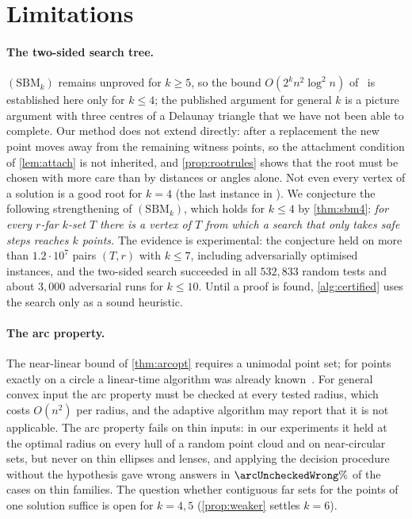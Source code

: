 \section{Limitations}\label{sec:limitations}

\paragraph{The two-sided search tree.}
$(\mathrm{SBM}_k)$ remains unproved for $k\ge5$, so the bound
$O(2^kn^2\log^2n)$ of~\citet{sbm} is established here only for $k\le4$; the
published argument for general $k$ is a picture argument with three centres of
a Delaunay triangle that we have not been able to complete. Our method does not
extend directly: after a replacement the new point moves away from the
remaining witness points, so the attachment condition of \cref{lem:attach} is
not inherited, and \cref{prop:rootrules} shows that the root must be chosen
with more care than by distances or angles alone. Not even every vertex of a
solution is a good root for $k=4$ (the last instance in
). We conjecture the following
strengthening of $(\mathrm{SBM}_k)$, which holds for $k\le4$ by
\cref{thm:sbm4}: \emph{for every $r$-far $k$-set $T$ there is a vertex of $T$
from which a search that only takes safe steps reaches $k$ points.} The
evidence is experimental: the conjecture held on more than $1.2\cdot10^7$
pairs $(T,r)$ with $k\le7$, including adversarially optimised instances, and
the two-sided search succeeded in all $532{,}833$ random tests and about
$3{,}000$ adversarial runs for $k\le10$. Until a proof is found,
\cref{alg:certified} uses the search only as a sound heuristic.

\paragraph{The arc property.}
The near-linear bound of \cref{thm:arcopt} requires a unimodal point set; for
points exactly on a circle a linear-time algorithm was already
known~\citep{akagi}. For general convex input the arc property must be checked
at every tested radius, which costs $O(n^2)$ per radius, and the adaptive
algorithm may report that it is not applicable. The arc property fails on thin
inputs: in our experiments it held at the optimal radius on every hull of a
random point cloud and on near-circular sets, but never on thin ellipses and
lenses, and applying the decision procedure without the hypothesis gave wrong
answers in $\arcUncheckedWrong\%$ of the cases on thin families. The question
whether contiguous far sets for the points of one solution suffice is open for
$k=4,5$ (\cref{prop:weaker} settles $k=6$).


